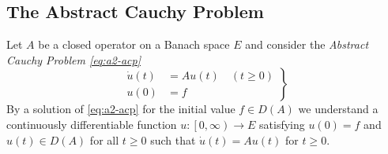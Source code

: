 \subsection{The Abstract Cauchy Problem} \label{subsec:a2-1.se1}
Let $A$ be a closed operator on a Banach space $E$ and consider the \emph{Abstract Cauchy Problem \eqref{eq:a2-acp}}
\begin{equation*}\label{eq:a2-acp} \tag{ACP}
\left.
\begin{aligned}
    \dot{u}(t) &= Au(t) \quad (t \geq 0) \\
    u(0) &= f
\end{aligned} 
\right\}   
\end{equation*}
By a solution of \eqref{eq:a2-acp} for the initial value $f \in D(A)$ we understand a continuously differentiable function $u \colon \left[0,\infty\right) \to E$ satisfying $u(0) = f$ and $u(t) \in D(A)$ for all $t \geq 0$ such that $\dot{u}(t) = Au(t)$ for $t \geq 0$.

